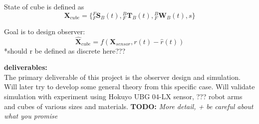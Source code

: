 State of cube is defined as 
\begin{equation}
	\mathbf{X}_{cube} = 
	\{{^{F}_{F}\mathbf{S}^{}_{B}(t)},{^{B}_{F}\mathbf{T}^{}_{B}(t)},{^{B}_{F}\mathbf{W}^{}_{B}(t)},
	s\}
\end{equation}

Goal is to design observer:
\begin{equation}
	\hat{\mathbf{X}}_{cube} = f(\mathbf{X}_{sensor},r(t)-\hat{r}(t))
\end{equation}
*should r be defined as discrete here???

\textbf{deliverables:} \\
The primary deliverable of this project is the observer design and simulation. Will later try to develop some general theory from this specific case. Will validate simulation with experiment using Hokuyo UBG 04-LX sensor, ??? robot arms and cubes of various sizes and materials.
\textbf{TODO:} \textit{More detail, + be careful about what you promise}

